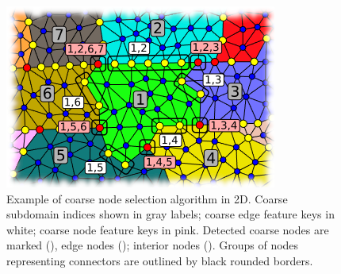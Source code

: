 \begin{figure}[htbp]
  \centerline{\includegraphics[width=0.5\linewidth]{figs/MsRSB/coarsening_2d_zoom_labels}}
  \caption[Coarse node selection algorithm example in 2D]{\label{fig:coarse_nodes_algo_zoom} Example of coarse node selection algorithm in 2D. Coarse subdomain indices shown in gray labels; coarse edge feature keys in white; coarse node feature keys in pink. Detected coarse nodes are marked (), edge nodes (); interior nodes (). Groups of nodes representing connectors are outlined by black rounded borders.}
\end{figure}

